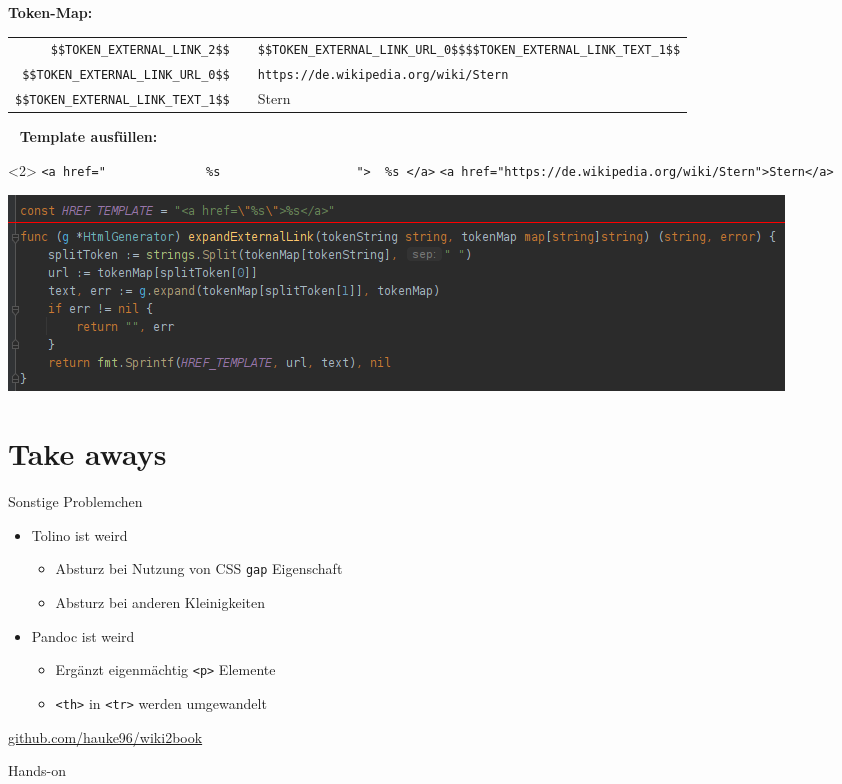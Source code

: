 \documentclass[9pt]{beamer}
\begin{document}
	\begin{frame}[fragile]
		\textbf{Token-Map:}\n
		\hspace{-0.65cm}
		\addtolength{\tabcolsep}{-0.5\tabcolsep}
		\begin{tabularx}{\textwidth}{rcp{6cm}}
			\verb+$$TOKEN_EXTERNAL_LINK_2$$+		& \textrightarrow & \verb+$$TOKEN_EXTERNAL_LINK_URL_0$$+\newline\verb+$$TOKEN_EXTERNAL_LINK_TEXT_1$$+\\
			\verb+$$TOKEN_EXTERNAL_LINK_URL_0$$+	& \textrightarrow & \verb+https://de.wikipedia.org/wiki/Stern+\\
			\verb+$$TOKEN_EXTERNAL_LINK_TEXT_1$$+	& \textrightarrow & Stern\\
		\end{tabularx}
		~\n\pause
		\textbf{Template ausfüllen:}\n
		\begin{onlyenv}<2>
			\verb+<a href="              %s                   ">  %s </a>+
			\verb+<a href="https://de.wikipedia.org/wiki/Stern">Stern</a>+
		\end{onlyenv}
		{
			\includegraphics[width=\linewidth]{images/code-html-generation.png}
		}
	\end{frame}
	
	\section{Take aways}

	\begin{frame}{Sonstige Problemchen}
		\begin{itemize}
			\item Tolino ist weird
			\begin{itemize}
				\item Absturz bei Nutzung von CSS \texttt{gap} Eigenschaft
				\item Absturz bei anderen Kleinigkeiten
			\end{itemize}\pause
			\item Pandoc ist weird
			\begin{itemize}
				\item Ergänzt eigenmächtig \texttt{<p>} Elemente
				\item \texttt{<th>} in \texttt{<tr>} werden umgewandelt
			\end{itemize}
		\end{itemize}
	\end{frame}
	
	\begin{frame}
		\vspace{1cm}
		\centering\href{https://github.com/hauke96/wiki2book}{github.com/hauke96/wiki2book}
	\end{frame}
	
	\begin{frame}
		\vspace{1cm}
		\centering Hands-on
	\end{frame}
\end{document}
